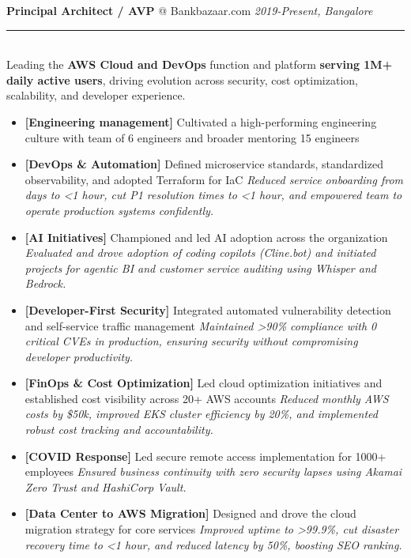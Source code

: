 \documentclass[11pt]{article}
\makeatletter
\newcommand{\roleheader}[3]{%
  {\large\sffamily\textbf{#1} @ #2} \hfill \textit{#3}\\[-0.3em]
  \color{myblue}\rule{\linewidth}{1pt}\\[0.5em]\color{bodytext}
}
\newenvironment{experiencebullets}{%
  \begin{itemize}[leftmargin=1.25em, itemsep=-0.25em]
    \renewcommand{\labelitemi}{\textbullet}
}{%
  \end{itemize}
}
\newenvironment{experience}[4]{%
  \roleheader{#1}{#2}{#3}%
  #4\vspace{0.5em}%
}{%
  \vspace{1em}
}
\newcommand{\expbullet}[3]{%
  \item \textbf{[#1]} {#2} \textrightarrow{} \textit{#3}%
}
\newcommand{\aexpbullet}[2]{%
  \item {#1} \textrightarrow{} \textit{#2}%
}
\makeatother
\begin{document}
\begin{experience}{Principal Architect / AVP}{Bankbazaar.com}{2019-Present, Bangalore}{%
    Leading the \textbf{AWS Cloud and DevOps} function and platform \textbf{serving 1M+ daily active users}, driving evolution across security, cost optimization, scalability, and developer experience.%
  }

  \begin{experiencebullets}

    \item \textbf{[Engineering management]} Cultivated a high-performing engineering culture with team of 6 engineers and broader mentoring 15 engineers
    {
    }

    \expbullet{DevOps \& Automation}{Defined microservice standards, standardized observability, and adopted Terraform for IaC}{Reduced service onboarding from days to <1 hour, cut P1 resolution times to <1 hour, and empowered team to operate production systems confidently.}

    \expbullet {AI Initiatives}{Championed and led AI adoption across the organization}
    {Evaluated and drove adoption of coding copilots (Cline.bot) and initiated projects for agentic BI and customer service auditing using Whisper and Bedrock.}

    \expbullet{Developer-First Security}{Integrated automated vulnerability detection and self-service traffic management}{Maintained >90\% compliance with 0 critical CVEs in production, ensuring security without compromising developer productivity.}

    \expbullet{FinOps \& Cost Optimization}{Led cloud optimization initiatives and established cost visibility across 20+ AWS accounts}{Reduced monthly AWS costs by \$50k, improved EKS cluster efficiency by 20\%, and implemented robust cost tracking and accountability.}

    \expbullet {COVID Response}{Led secure remote access implementation for 1000+ employees}
    {Ensured business continuity with zero security lapses using Akamai Zero Trust and HashiCorp Vault.}

    \expbullet {Data Center to AWS Migration}{Designed and drove the cloud migration strategy for core services}
    {Improved uptime to >99.9\%, cut disaster recovery time to <1 hour, and reduced latency by 50\%, boosting SEO ranking.}
  \end{experiencebullets}

\end{experience}
\end{document}
